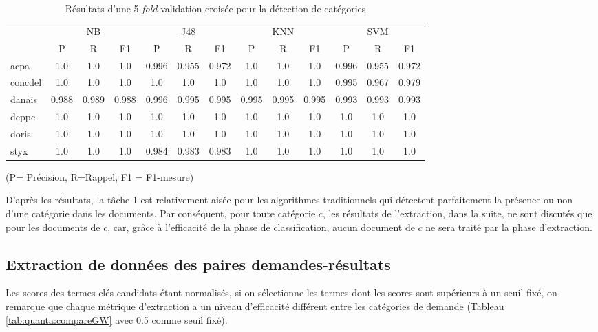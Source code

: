 \begin{table}[!h]
	\scriptsize
	\centering
	\begin{tabular}{l|ccc|ccc|ccc|ccc}
		\hline\noalign{\smallskip}
		&   \multicolumn{3}{|c|}{NB}    &    \multicolumn{3}{|c|}{J48}   &  \multicolumn{3}{|c|}{KNN}  & \multicolumn{3}{|c}{SVM}     \\       
		\noalign{\smallskip}
		\hline
		\noalign{\smallskip}
		& P     & R     & F1    & P     & R     & F1    & P     & R     & F1    & P     & R     & F1    \\        
		\noalign{\smallskip}
		\hline
		\noalign{\smallskip}
		acpa    & 1.0 & 1.0 & 1.0 & 0.996 & 0.955 & 0.972 & 1.0 & 1.0 & 1.0 & 0.996 & 0.955 & 0.972 \\
		concdel & 1.0 & 1.0 & 1.0 & 1.0 & 1.0 & 1.0 & 1.0 & 1.0 & 1.0 & 0.995 & 0.967 & 0.979 \\
		danais  & 0.988 & 0.989 & 0.988 & 0.996 & 0.995 & 0.995 & 0.995 & 0.995 & 0.995 & 0.993 & 0.993 & 0.993 \\
		dcppc   & 1.0 & 1.0 & 1.0 & 1.0 & 1.0 & 1.0 & 1.0 & 1.0 & 1.0 & 1.0 & 1.0 & 1.0 \\
		doris   & 1.0 & 1.0 & 1.0 & 1.0 & 1.0 & 1.0 & 1.0 & 1.0 & 1.0 & 1.0 & 1.0 & 1.0 \\
		styx    & 1.0 & 1.0 & 1.0 & 0.984 & 0.983 & 0.983 & 1.0 & 1.0 & 1.0 & 1.0 & 1.0 & 1.0 \\
		\hline
	\end{tabular}
(P= Précision, R=Rappel, F1 = F1-mesure)
	\caption{Résultats d'une 5-\textit{fold} validation croisée pour la détection de catégories }\label{tab:quanta:resultat-detect-cat}
\end{table}

D'après les résultats, la tâche 1 est relativement aisée pour les algorithmes traditionnels qui détectent parfaitement la présence ou non d'une catégorie dans les documents. Par conséquent, pour toute catégorie $c$, les résultats de l'extraction, dans la suite, ne sont discutés que pour les documents de $c$, car, grâce à l'efficacité de la phase de classification, aucun document de $\overline{c}$ ne sera traité par la phase d'extraction.

\subsection{Extraction de données des paires demandes-résultats}
Les scores des termes-clés candidats étant normalisés, si on sélectionne les termes dont les scores sont supérieurs à un seuil fixé, on remarque que chaque métrique d'extraction a un niveau d'efficacité différent entre les catégories de demande (Tableau \ref{tab:quanta:compareGW} avec 0.5 comme  seuil fixé). 

